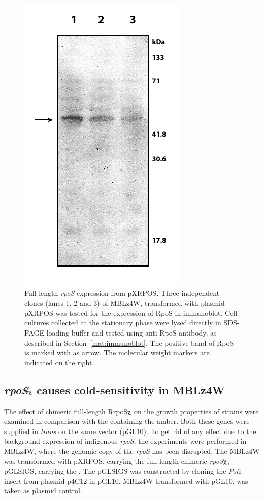 \begin{figure}[tbp]
\centering
\includegraphics{figures/chap6_pxrpos_western}
\caption[Full-length \emph{rpoS} expression from
pXRPOS]{Full-length \emph{rpoS} expression from pXRPOS. Three
independent clones (lanes 1, 2 and 3) of MBLz4W, transformed with
plasmid pXRPOS was tested for the expression of RpoS in
immunoblot. Cell cultures collected at the stationary phase were
lysed directly in SDS-PAGE loading buffer and tested using
anti-RpoS antibody, as described in Section~\ref{mat:immunoblot}.
The positive band of RpoS is marked with as arrow. The molecular
weight markers are indicated on the right.}
\label{chap6:pxrpos_expression}
\end{figure}

\subsection{\emph{rpoS}$\chiup$ causes cold-sensitivity in MBLz4W}
\label{cold_sensitivity}

The effect of chimeric full-length RrpoS$\chiup$ on the growth
properties of  strains were examined in comparison
with the \lzsig{} containing the amber. Both these genes were
supplied in \emph{trans} on the same vector (pGL10). To get rid of
any effect due to the background expression of indigenous
\emph{rpoS}, the experiments were performed in MBLz4W, where the
genomic copy of the \emph{rpoS} has been disrupted. The MBLz4W was
transformed with pXRPOS, carrying the full-length chimeric
\emph{rpoS}$\chiup$, pGLSIGS, carrying the \lzsig{}. The pGLSIGS
was constructed by cloning the \emph{Pst}I insert from plasmid
p4C12 in pGL10. MBLz4W transformed with pGL10, was taken as
plasmid control.

